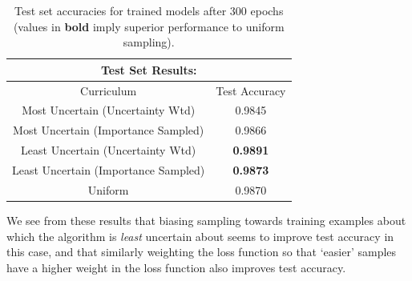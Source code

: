 \documentclass[a4paper,10.5pt]{article}
\begin{document}
\begin{table}[ht]
\begin{center}
\begin{tabular}{|c|c|}
\hline
\multicolumn{2}{|c|}{Test Set Results:} \\
\hline
Curriculum &  Test Accuracy \\
\hline
Most Uncertain (Uncertainty Wtd) 		&	0.9845 \\
Most Uncertain (Importance Sampled)	& 0.9866 \\
Least Uncertain (Uncertainty Wtd) 	& \textbf{0.9891} \\
Least Uncertain (Importance Sampled)& \textbf{0.9873} \\
Uniform															& 0.9870 \\
\hline
\end{tabular}
\end{center}
\caption{Test set accuracies for trained models after 300 epochs (values in \textbf{bold} imply superior performance to uniform sampling).}
\end{table}

We see from these results that biasing sampling towards training examples about which the algorithm is \textit{least} uncertain about seems to improve test accuracy in this case, and that similarly weighting the loss function so that `easier' samples have a higher weight in the loss function also improves test accuracy. 
\end{document}
